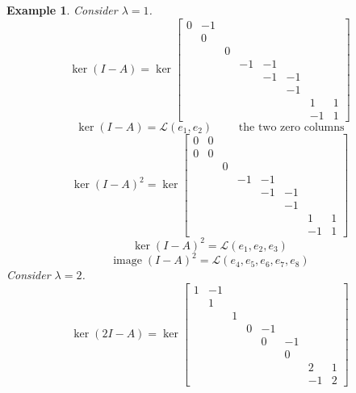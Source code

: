 \documentclass{article}
\newtheorem{example}{Example}  \numberwithin{example}{section}
\DeclareMathOperator{\im}{image}
\begin{document}
\begin{example}
  Consider $\lambda = 1$.
  \[
    \ker\left( I - A \right) =
    \ker\begin{bmatrix}
      0 & -1 &   &    &    &    &    & \\
        & 0  &   &    &    &    &    & \\
        &    & 0 &    &    &    &    & \\
        &    &   & -1 & -1 &    &    & \\
        &    &   &    & -1 & -1 &    & \\
        &    &   &    &    & -1 &    & \\
        &    &   &    &    &    & 1  & 1 \\
        &    &   &    &    &    & -1 & 1
    \end{bmatrix}
  \]
  \[ \ker(I - A) = \mathcal L(e_1, e_2) \qquad \text{ the two zero columns} \]
  \[
    \ker(I - A)^2 = \ker\begin{bmatrix}
      0 & 0  &   &    &    &    &    & \\
      0 & 0  &   &    &    &    &    & \\
        &    & 0 &    &    &    &    & \\
        &    &   & -1 & -1 &    &    & \\ %
        &    &   &    & -1 & -1 &    & \\ %
        &    &   &    &    & -1 &    & \\ %
        &    &   &    &    &    & 1  & 1 \\ %
        &    &   &    &    &    & -1 & 1    %
    \end{bmatrix}
  \]
  \[ \ker(I - A)^2 = \mathcal L(e_1, e_2, e_3) \]
  \[ \im(I - A)^2 = \mathcal L(e_4, e_5, e_6, e_7, e_8) \]
  Consider $\lambda = 2$.
  \[
    \ker(2I - A) = \ker\begin{bmatrix}
      1 & -1 &   &    &    &    &    & \\
        & 1  &   &    &    &    &    & \\
        &    & 1 &    &    &    &    & \\
        &    &   & 0  & -1 &    &    & \\
        &    &   &    & 0  & -1 &    & \\
        &    &   &    &    & 0  &    & \\
        &    &   &    &    &    & 2  & 1 \\
        &    &   &    &    &    & -1 & 2
    \end{bmatrix}
  \] \[
\]
\end{example}
\end{document}
